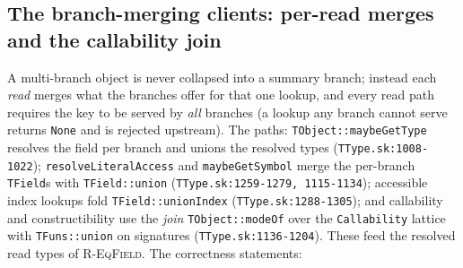 \documentclass[11pt]{article}
\begin{document}
\subsection{The branch-merging clients: per-read merges and the
callability join}
\label{sec:tfields-union}

A multi-branch object is never collapsed into a summary branch; instead
each \emph{read} merges what the branches offer for that one lookup,
and every read path requires the key to be served by \emph{all}
branches (a lookup any branch cannot serve returns \texttt{None} and is
rejected upstream). The paths: \texttt{TObject::maybeGetType} resolves
the field per branch and unions the resolved types
(\texttt{TType.sk:1008-1022}); \texttt{resolveLiteralAccess} and
\texttt{maybeGetSymbol} merge the per-branch \texttt{TField}s with
\texttt{TField::union} (\texttt{TType.sk:1259-1279, 1115-1134});
accessible index lookups fold \texttt{TField::unionIndex}
(\texttt{TType.sk:1288-1305}); and callability and constructibility use the
\emph{join} \texttt{TObject::modeOf} over the \texttt{Callability}
lattice with \texttt{TFuns::union} on signatures
(\texttt{TType.sk:1136-1204}). These feed the resolved read types of
\textsc{R-EqField}. The correctness statements:
\end{document}
